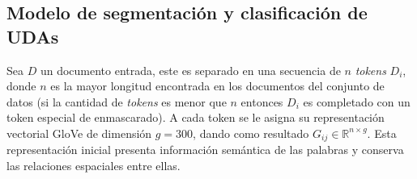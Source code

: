 \documentclass[a4paper,11pt,twocolumn,twoside]{article}
\begin{document}


\subsection{Modelo de segmentación y clasificación de UDAs}\label{ssec:segm_clsf_uda}

Sea $D$ un documento entrada, este es separado en una secuencia de $n$ \textit{tokens} $D_i$, donde $n$ es la mayor longitud encontrada
en los documentos del conjunto de datos (si la cantidad de \textit{tokens} es menor que $n$ entonces $D_i$ es completado con un token especial de enmascarado). 
A cada token se le asigna
su representación vectorial GloVe de dimensión $g=300$, dando como resultado $G_{ij} \in \mathbb{R}^{n \times g}$.
Esta representación inicial presenta información semántica de las palabras y conserva las relaciones 
espaciales entre ellas. 
\end{document}
